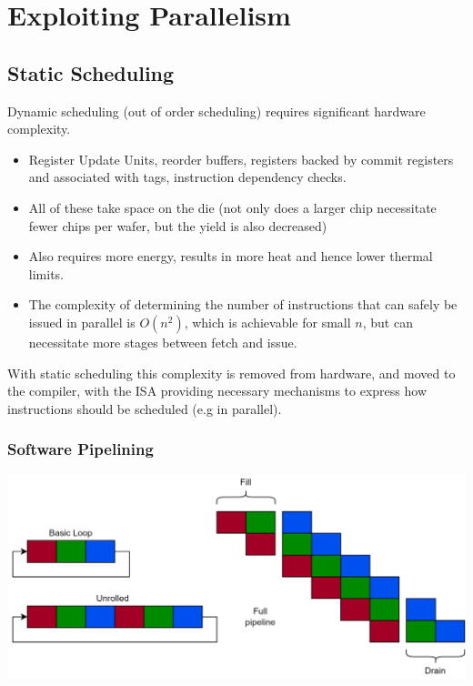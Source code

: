 \chapter{Exploiting Parallelism}

\section{Static Scheduling}
Dynamic scheduling (out of order scheduling) requires significant hardware complexity.
\begin{itemize}
	\item Register Update Units, reorder buffers, registers backed by commit registers and associated with tags, instruction dependency checks.
	\item All of these take space on the die (not only does a larger chip necessitate fewer chips per wafer, but the yield is also decreased)
	\item Also requires more energy, results in more heat and hence lower thermal limits.
	\item The complexity of determining the number of instructions that can safely be issued in parallel is $O(n^2)$, which is achievable for small $n$, but can necessitate more stages between fetch and issue.
\end{itemize}
With static scheduling this complexity is removed from hardware, and moved to the compiler, with the ISA providing necessary mechanisms to express how instructions should be scheduled (e.g in parallel).

\subsection{Software Pipelining}
\begin{center}
	\includegraphics[width=\textwidth]{exploiting_parallelism/images/software_pipelining.drawio.png}
\end{center}

